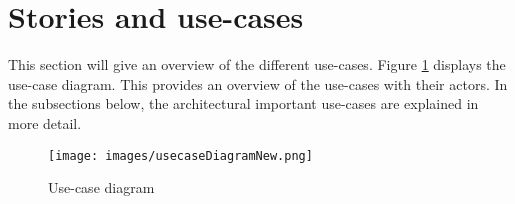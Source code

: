 

\clearpage


\section{Stories and use-cases}
This section will give an overview of the different use-cases. Figure \ref{fig:usecase-diagram} displays the use-case diagram. This provides an overview of the use-cases with their actors. In the subsections below, the architectural important use-cases are explained in more detail.

\begin{figure}[H]
	\centering
	\texttt{[image: images/usecaseDiagramNew.png]}
	\caption{Use-case diagram}
	\label{fig:usecase-diagram}
\end{figure}




